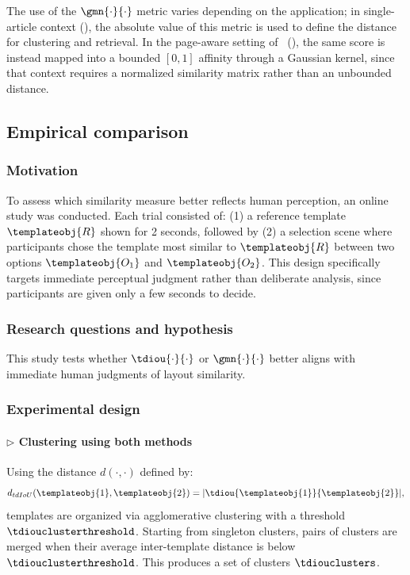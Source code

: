 The use of the $\gmn{\cdot}{\cdot}$ metric varies depending on the application; in single-article context (), the absolute value of this metric is used to define the distance for clustering and retrieval. In the page-aware setting of \neuralmethod\ (), the same score is instead mapped into a bounded $[0,1]$ affinity through a Gaussian kernel, since that context requires a normalized similarity matrix rather than an unbounded distance.


\subsection{Empirical comparison}

\subsubsection{Motivation}

To assess which similarity measure better reflects human perception, an online study was conducted. Each trial consisted of: (1) a reference template $\templateobj{R}$ shown for 2 seconds, followed by (2) a selection scene where participants chose the template most similar to $\templateobj{R}$ between two options $\templateobj{O_1}$ and $\templateobj{O_2}$. This design specifically targets immediate perceptual judgment rather than deliberate analysis, since participants are given only a few seconds to decide.

\subsubsection{Research questions and hypothesis}

This study tests whether $\tdiou{\cdot}{\cdot}$ or $\gmn{\cdot}{\cdot}$ better aligns with immediate human judgments of layout similarity.

\subsubsection{Experimental design}

\paragraph{$\triangleright$ Clustering using both methods}

Using the distance $d(\cdot,\cdot)$ defined by:
\begin{equation}
d_{tdIoU}(\templateobj{1},\templateobj{2}) = |\tdiou{\templateobj{1}}{\templateobj{2}}|,
\label{eq:clustering-distance-definition}
\end{equation}
templates are organized via agglomerative clustering with a threshold $\tdiouclusterthreshold$. Starting from singleton clusters, pairs of clusters are merged when their average inter-template distance is below $\tdiouclusterthreshold$. This produces a set of clusters $\tdiouclusters$.


